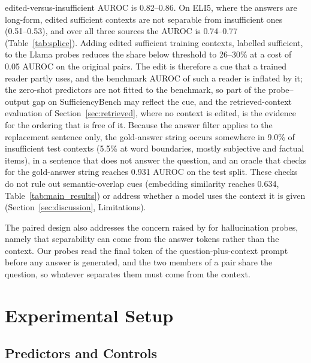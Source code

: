 \documentclass[acmsmall,screen,review]{acmart}
\newcommand{\bench}{SufficiencyBench}
\begin{document}
edited-versus-insufficient AUROC is 0.82--0.86. On ELI5, where the answers are long-form, edited sufficient contexts are not separable from insufficient ones (0.51--0.53), and over all three sources the AUROC is 0.74--0.77 (Table~\ref{tab:splice}). Adding edited sufficient training contexts, labelled sufficient, to the Llama probes reduces the share below threshold to 26--30\% at a cost of 0.05 AUROC on the original pairs. The edit is therefore a cue that a trained reader partly uses, and the benchmark AUROC of such a reader is inflated by it; the zero-shot predictors are not fitted to the benchmark, so part of the probe--output gap on \bench{} may reflect the cue, and the retrieved-context evaluation of Section~\ref{sec:retrieved}, where no context is edited, is the evidence for the ordering that is free of it. Because the answer filter applies to the replacement sentence only, the gold-answer string occurs somewhere in 9.0\% of insufficient test contexts (5.5\% at word boundaries, mostly subjective and factual items), in a sentence that does not answer the question, and an oracle that checks for the gold-answer string reaches 0.931 AUROC on the test split. These checks do not rule out semantic-overlap cues (embedding similarity reaches 0.634, Table~\ref{tab:main_results}) or address whether a model uses the context it is given (Section~\ref{sec:discussion}, Limitations).

The paired design also addresses the concern raised by \citet{magata2026answeronly} for hallucination probes, namely that separability can come from the answer tokens rather than the context. Our probes read the final token of the question-plus-context prompt before any answer is generated, and the two members of a pair share the question, so whatever separates them must come from the context.

\section{Experimental Setup}
\label{sec:methods}

\subsection{Predictors and Controls}
\label{sec:methods_detection}
\end{document}
